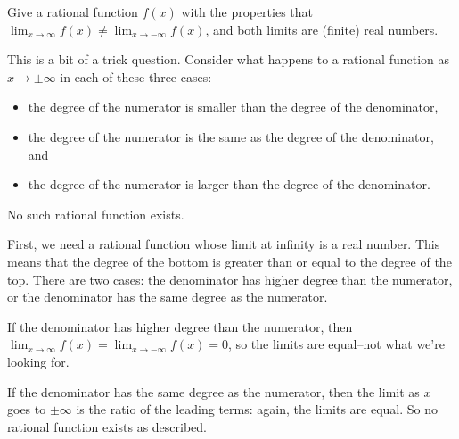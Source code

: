 \begin{Mquestion} Give a rational function $f(x)$ with the properties that $\displaystyle\lim_{x \rightarrow\infty} f(x) \neq \displaystyle\lim_{x \rightarrow -\infty} f(x)$, and both limits are (finite) real numbers.
\end{Mquestion}
\begin{hint} This is a bit of a trick question.
Consider what happens to a rational function as
         $x\rightarrow\pm \infty$ in each of these three cases:
         \begin{itemize}
          \item the degree of the numerator is smaller than the degree of
             the denominator,
           \item the degree of the numerator is the same as the degree of
             the denominator, and
           \item the degree of the numerator is larger than the degree of
             the denominator.
             \end{itemize}
\end{hint}
\begin{answer} No such rational function exists.
\end{answer}
\begin{solution} First, we need a rational function whose limit at infinity is a real number. This means that the degree of the bottom is greater than or equal to the degree of the top. There are two cases: the denominator has higher degree than the numerator, or the denominator has the same degree as the numerator.

If the denominator has higher degree than the numerator, then $\displaystyle\lim_{x \rightarrow \infty} f(x)=\displaystyle\lim_{x \rightarrow -\infty} f(x)=0$, so the limits are equal--not what we're looking for.

If the denominator has the same degree as the numerator, then the limit as $x$ goes to $\pm \infty$ is the ratio of the leading terms: again, the limits are equal. So no rational function exists as described.
\end{solution}



